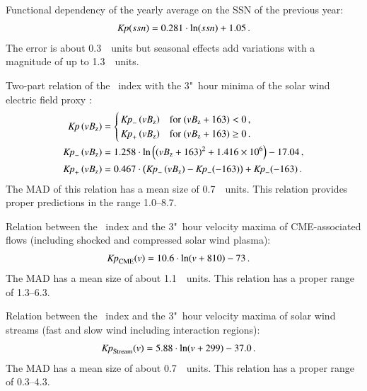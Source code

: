 \begin{itemize*}
	\item Functional dependency of the yearly \Kp{} average on the SSN of the previous year:
	\begin{align*}
		\textit{Kp}(ssn) = 0.281 \cdot \ln(ssn) + 1.05	\,.
	\end{align*}
	The error is about 0.3~\Kp~units but seasonal effects add variations with a magnitude of up to 1.3~\Kp~units.

	\item Two-part relation of the \Kp~index with the 3"~hour minima of the solar wind electric field proxy \vBz{}:
	\begin{align*}
		\text{\textit{Kp}}\left(vB_\text{z}\right) &=
		\begin{cases}
			\,\text{\textit{Kp}}_-\left(vB_\text{z}\right) &\text{for~} (vB_\text{z} + 163) < 0	\,,\\
			\,\text{\textit{Kp}}_+\left(vB_\text{z}\right) &\text{for~} (vB_\text{z} + 163) \ge 0	\,.
		\end{cases}\\
		\text{\textit{Kp}}_-\left(vB_\text{z}\right) &= 1.258 \cdot \ln\left(\left(vB_\text{z} + 163\right)^2 + \num{1.416e6}\right) - 17.04	\,,\\
		\text{\textit{Kp}}_+\left(vB_\text{z}\right) &= 0.467 \cdot \left(\text{\textit{Kp}}_-\left(vB_\text{z}\right) - \text{\textit{Kp}}_-(-163)\right) + \text{\textit{Kp}}_-(-163)	\,.
	\end{align*}
	The MAD of this relation has a mean size of 0.7~\Kp~units. This relation provides proper predictions in the \Kp{} range \numrange{1.0}{8.7}.

	\item Relation between the \Kp~index and the 3"~hour velocity maxima of CME-associated flows (including shocked and compressed solar wind plasma):
	\begin{align*}
		\text{\textit{Kp}}_\text{CME}(v) &= 10.6 \cdot \ln(v + 810) - 73	\,.
	\end{align*}
	The MAD has a mean size of about 1.1~\Kp~units. This relation has a proper range of \numrange{1.3}{6.3}.

	\item Relation between the \Kp~index and the 3"~hour velocity maxima of solar wind streams (fast and slow wind including interaction regions):
	\begin{align*}
		\text{\textit{Kp}}_\text{Stream}(v) &= 5.88 \cdot \ln(v + 299) - 37.0	\,.
	\end{align*}
	The MAD has a mean size of about 0.7~\Kp~units. This relation has a proper range of \numrange{0.3}{4.3}.
\end{itemize*}


